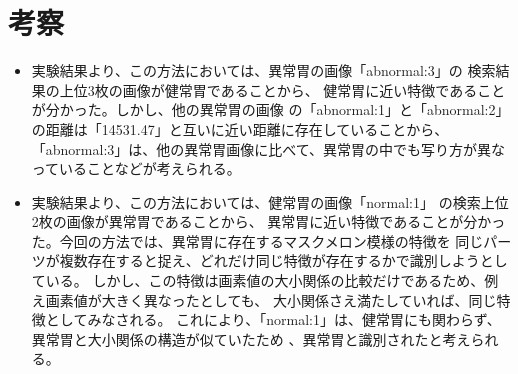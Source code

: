 \section{考察}
\begin{itemize}
  \item 実験結果より、この方法においては、異常胃の画像「abnormal:3」の
  検索結果の上位3枚の画像が健常胃であることから、
  健常胃に近い特徴であることが分かった。しかし、他の異常胃の画像
  の「abnormal:1」と「abnormal:2」の距離は「14531.47」と互いに近い距離に存在していることから、
  「abnormal:3」は、他の異常胃画像に比べて、異常胃の中でも写り方が異なっていることなどが考えられる。
  \item 実験結果より、この方法においては、健常胃の画像「normal:1」
  の検索上位2枚の画像が異常胃であることから、
  異常胃に近い特徴であることが分かった。今回の方法では、異常胃に存在するマスクメロン模様の特徴を
  同じパーツが複数存在すると捉え、どれだけ同じ特徴が存在するかで識別しようとしている。
  しかし、この特徴は画素値の大小関係の比較だけであるため、例え画素値が大きく異なったとしても、
  大小関係さえ満たしていれば、同じ特徴としてみなされる。
  これにより、「normal:1」は、健常胃にも関わらず、異常胃と大小関係の構造が似ていたため
  、異常胃と識別されたと考えられる。
\end{itemize}
